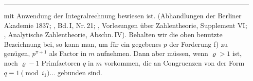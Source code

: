 \noindent\rule{4cm}{0.4pt}

\footnotesize
{} mit Anwendung der Integralrechnung bewiesen ist. (Abhandlungen
der Berliner Akademie 1837; , Bd.\,I, Nr.\,21;
, Vorlesungen \"uber Zahlentheorie, Supplement VI;
, Analytische Zahlentheorie, Abschn.\,IV). Behalten wir die oben
benutzte Bezeichnung bei, so kann man, um f\"ur ein gegebenes $p$ der
Forderung f) zu gen\"ugen, $p^{\pi+1}$ als Factor in $m$ aufnehmen. Dann
aber m\"ussen, wenn $\varrho > 1$ ist, noch $\varrho - 1$ Primfactoren
$q$ in $m$ vorkommen, die an Congruenzen von der Form $q \equiv 1
\pmod{i_1} \dots$ gebunden sind.
\normalsize

